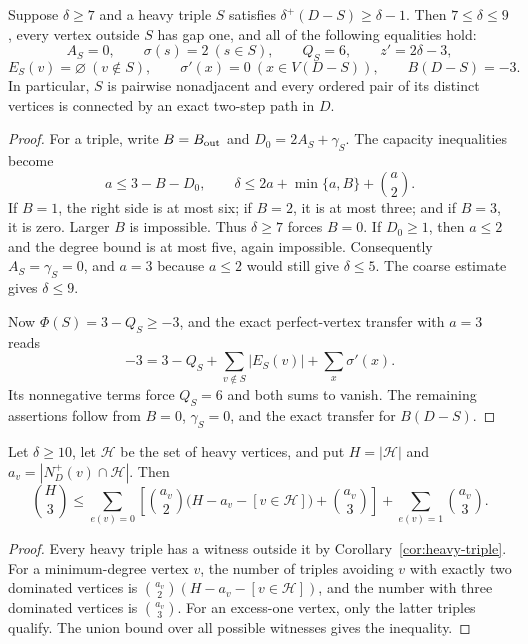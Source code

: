 \begin{corollary}
\label{cor:heavy-triple-saturation}
Suppose $\delta\ge7$ and a heavy triple $S$ satisfies
$\delta^+(D-S)\ge\delta-1$.  Then $7\le\delta\le9$, every vertex
outside $S$ has gap one, and all of the following equalities hold:
\[
 A_S=0,\qquad \sigma(s)=2\ (s\in S),\qquad Q_S=6,
 \qquad z'=2\delta-3,
\]
\[
 E_S(v)=\varnothing\ (v\notin S),\qquad
 \sigma'(x)=0\ (x\in V(D-S)),\qquad B(D-S)=-3.
\]
In particular, $S$ is pairwise nonadjacent and every ordered pair
of its distinct vertices is connected by an exact two-step path in $D$.
\end{corollary}
\begin{proof}
For a triple, write $B=B_{\rm out}$ and
$D_0=2A_S+\gamma_S$.  The capacity inequalities become
\[
 a\le3-B-D_0,\qquad
 \delta\le2a+\min\{a,B\}+\binom a2.
\]
If $B=1$, the right side is at most six; if $B=2$, it is at most
three; and if $B=3$, it is zero.  Larger $B$ is impossible.
Thus $\delta\ge7$ forces $B=0$.  If $D_0\ge1$, then $a\le2$
and the degree bound is at most five, again impossible.
Consequently $A_S=\gamma_S=0$, and $a=3$ because $a\le2$ would
still give $\delta\le5$.  The coarse estimate gives $\delta\le9$.

Now $\Phi(S)=3-Q_S\ge-3$, and the exact perfect-vertex transfer
with $a=3$ reads
\[
 -3=3-Q_S+\sum_{v\notin S}|E_S(v)|+\sum_x\sigma'(x).
\]
Its nonnegative terms force $Q_S=6$ and both sums to vanish.
The remaining assertions follow from $B=0$, $\gamma_S=0$,
and the exact transfer for $B(D-S)$.
\end{proof}


\begin{corollary}\label{cor:cover-heavy-triples}
Let $\delta\ge10$, let $\mathcal H$ be the set of heavy vertices,
and put $H=|\mathcal H|$ and $a_v=|N_D^+(v)\cap\mathcal H|$.
Then
\[
 \binom H3\le
 \sum_{e(v)=0}\left[
   \binom{a_v}{2}\bigl(H-a_v-[v\in\mathcal H]\bigr)
       +\binom{a_v}{3}\right]
       +\sum_{e(v)=1}\binom{a_v}{3}.
\]
\end{corollary}
\begin{proof}
Every heavy triple has a witness outside it by
Corollary~\ref{cor:heavy-triple}.  For a minimum-degree vertex $v$,
the number of triples avoiding $v$ with exactly two dominated
vertices is $\binom{a_v}{2}(H-a_v-[v\in\mathcal H])$, and the number
with three dominated vertices is $\binom{a_v}{3}$.
For an excess-one vertex, only the latter triples qualify.
The union bound over all possible witnesses gives the inequality.
\end{proof}
